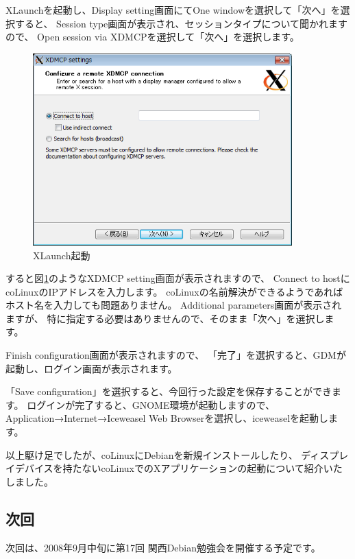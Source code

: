 \documentclass[mingoth,a4paper]{jsarticle}
\begin{document}
XLaunchを起動し、Display setting画面にてOne windowを選択して「次へ」を選択すると、
Session type画面が表示され、セッションタイプについて聞かれますので、
Open session via XDMCPを選択して「次へ」を選択します。
\begin{figure}[htbp]
 \begin{center}
  \includegraphics[width=100mm]{image200808/colinux_xlaunch_xdmcp.png}
 \end{center}
 \caption{XLaunch起動}
 \label{fig:colinux_xlaunch_xdmcp}
\end{figure}

すると図\ref{fig:colinux_xlaunch_xdmcp}のようなXDMCP setting画面が表示されますので、
Connect to hostにcoLinuxのIPアドレスを入力します。
coLinuxの名前解決ができるようであればホスト名を入力しても問題ありません。
Additional parameters画面が表示されますが、
特に指定する必要はありませんので、そのまま「次へ」を選択します。

Finish configuration画面が表示されますので、
「完了」を選択すると、GDMが起動し、ログイン画面が表示されます。

「Save configuration」を選択すると、今回行った設定を保存することができます。
ログインが完了すると、GNOME環境が起動しますので、
Application→Internet→Iceweasel Web Browserを選択し、iceweaselを起動します。

以上駆け足でしたが、coLinuxにDebianを新規インストールしたり、
ディスプレイデバイスを持たないcoLinuxでのXアプリケーションの起動について紹介いたしました。


\subsection{次回}
次回は、2008年9月中旬に第17回 関西Debian勉強会を開催する予定です。
\end{document}
